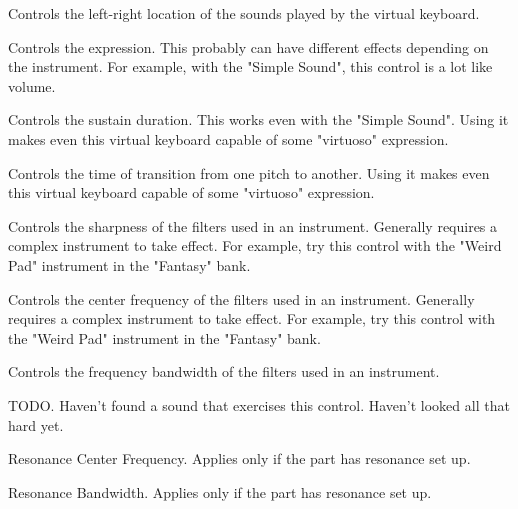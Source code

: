    Controls the left-right location of the sounds played by the virtual
   keyboard.

   Controls the expression.  This probably can have different effects depending
   on the instrument.  For example, with the "Simple Sound", this control is a
   lot like volume.

   Controls the sustain duration.  This works even with the "Simple Sound".
   Using it makes even this virtual keyboard capable of some "virtuoso"
   expression.

   Controls the time of transition from one pitch to another.
   Using it makes even this virtual keyboard capable of some "virtuoso"
   expression.

   Controls the sharpness of the filters used in an instrument.
   Generally requires a complex instrument to take effect.
   For example, try this control with the "Weird Pad" instrument in the
   "Fantasy" bank.

   Controls the center frequency of the filters used in an instrument.
   Generally requires a complex instrument to take effect.
   For example, try this control with the "Weird Pad" instrument in the
   "Fantasy" bank.

   Controls the frequency bandwidth of the filters used in an instrument.

   TODO.
   Haven't found a sound that exercises this control.
   Haven't looked all that hard yet.

   Resonance Center Frequency.
   Applies only if the part has resonance set up.

   Resonance Bandwidth.
   Applies only if the part has resonance set up.

